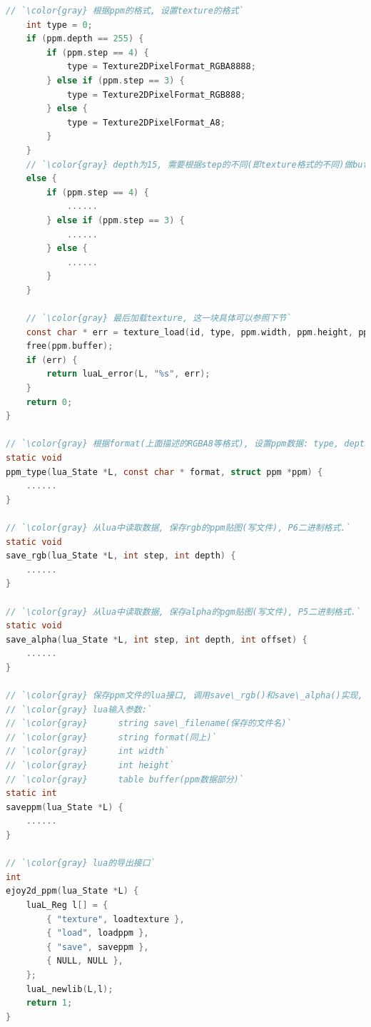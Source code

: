 {\begin{lstlisting}[language=C]
    // `\color{gray} 根据ppm的格式, 设置texture的格式`
    int type = 0;
    if (ppm.depth == 255) {
        if (ppm.step == 4) {
            type = Texture2DPixelFormat_RGBA8888;
        } else if (ppm.step == 3) {
            type = Texture2DPixelFormat_RGB888;
        } else {
            type = Texture2DPixelFormat_A8;
        }
    }
    // `\color{gray} depth为15, 需要根据step的不同(即texture格式的不同)做buffer的转换`
    else {
        if (ppm.step == 4) {
            ......
        } else if (ppm.step == 3) {
            ......
        } else {
            ......
        }
    }

    // `\color{gray} 最后加载texture, 这一块具体可以参照下节`
    const char * err = texture_load(id, type, ppm.width, ppm.height, ppm.buffer);
    free(ppm.buffer);
    if (err) {
        return luaL_error(L, "%s", err);
    }
    return 0;
}

// `\color{gray} 根据format(上面描述的RGBA8等格式), 设置ppm数据: type, depth, step`
static void
ppm_type(lua_State *L, const char * format, struct ppm *ppm) {
    ......
}

// `\color{gray} 从lua中读取数据, 保存rgb的ppm贴图(写文件), P6二进制格式.`
static void
save_rgb(lua_State *L, int step, int depth) {
    ......
}

// `\color{gray} 从lua中读取数据, 保存alpha的pgm贴图(写文件), P5二进制格式.`
static void
save_alpha(lua_State *L, int step, int depth, int offset) {
    ......
}

// `\color{gray} 保存ppm文件的lua接口, 调用save\_rgb()和save\_alpha()实现, 写文件.`
// `\color{gray} lua输入参数:`
// `\color{gray}      string save\_filename(保存的文件名)`
// `\color{gray}      string format(同上)`
// `\color{gray}      int width`
// `\color{gray}      int height`
// `\color{gray}      table buffer(ppm数据部分)`
static int
saveppm(lua_State *L) {
    ......
}

// `\color{gray} lua的导出接口`
int
ejoy2d_ppm(lua_State *L) {
    luaL_Reg l[] = {
        { "texture", loadtexture },
        { "load", loadppm },
        { "save", saveppm },
        { NULL, NULL },
    };
    luaL_newlib(L,l);
    return 1;
}

    \end{lstlisting}
}

